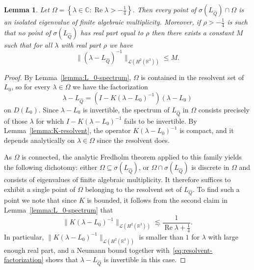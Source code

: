 \documentclass[11pt]{article}
\DeclareMathOperator{\real}{Re}
\newtheorem{lemma}[definition]{Lemma}
\begin{document}
\begin{lemma}\label{lemma:unstable-spectrum}
  Let
  \(\Omega = \left\{\lambda \in \mathbb{C} \colon \real \lambda >
    -\frac{1}{4}\right\}\). Then every point of
  \(\sigma(L_{\hat{Q}}) \cap \Omega\) is an isolated eigenvalue of
  finite algebraic multiplicity. Moreover, if \(\rho > -\frac{1}{4}\)
  is such that no point of \(\sigma(L_{\hat{Q}})\) has real part equal
  to \(\rho\) then there exists a constant \(M\) such that for all
  \(\lambda\) with real part \(\rho\) we have
  \begin{equation*}
    \|(\lambda - L_{\hat{Q}})^{-1}\|_{\mathcal{L}(H^{2}(\mathbb{R}^{3}))} \leq M.
  \end{equation*}
\end{lemma}

\begin{proof}
  By Lemma~\ref{lemma:L_0-spectrum}, \(\Omega\) is contained in the
  resolvent set of \(L_{0}\), so for every \(\lambda \in \Omega\) we
  have the factorization
  \begin{equation}\label{eq:resolvent-factorization}
    \lambda - L_{\hat{Q}} = (I - K(\lambda - L_{0})^{-1})(\lambda - L_{0})
  \end{equation}
  on \(D(L_{0})\). Since \(\lambda - L_{0}\) is invertible, the
  spectrum of \(L_{\hat{Q}}\) in \(\Omega\) consists precisely of
  those \(\lambda\) for which \(I - K(\lambda - L_{0})^{-1}\) fails to
  be invertible. By Lemma~\ref{lemma:K-resolvent}, the operator
  \(K(\lambda - L_{0})^{-1}\) is compact, and it depends analytically
  on \(\lambda \in \Omega\) since the resolvent does.

  As \(\Omega\) is connected, the analytic Fredholm theorem applied to
  this family yields the following dichotomy: either
  \(\Omega \subseteq \sigma(L_{\hat{Q}})\), or
  \(\Omega \cap \sigma(L_{\hat{Q}})\) is discrete in \(\Omega\) and
  consists of eigenvalues of finite algebraic multiplicity. It
  therefore suffices to exhibit a single point of \(\Omega\) belonging
  to the resolvent set of \(L_{\hat{Q}}\). To find such a point we
  note that since \(K\) is bounded, it follows from the second claim
  in Lemma~\ref{lemma:L_0-spectrum} that
  \begin{equation}\label{eq:K-resolvent-bound}
    \|K(\lambda - L_{0})^{-1}\|_{\mathcal{L}(H^{2}(\mathbb{R}^{3}))}
    \lesssim \frac{1}{\real \lambda + \frac{1}{4}}.
  \end{equation}
  In particular,
  \(\|K(\lambda - L_{0})^{-1}\|_{\mathcal{L}(H^{2}(\mathbb{R}^{3}))}\)
  is smaller than \(1\) for \(\lambda\) with large enough real part,
  and a Neumann bound together with~\eqref{eq:resolvent-factorization}
  shows that \(\lambda - L_{\hat{Q}}\) is invertible in this case.


\end{proof}
\end{document}
